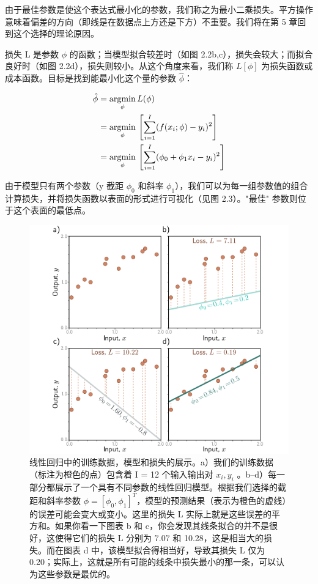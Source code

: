 由于最佳参数是使这个表达式最小化的参数，我们称之为最小二乘损失。平方操作意味着偏差的方向（即线是在数据点上方还是下方）不重要。我们将在第 5 章回到这个选择的理论原因。

损失 L 是参数 $\phi$ 的函数；当模型拟合较差时（如图 2.2b,c），损失会较大；而拟合良好时（如图 2.2d），损失则较小。从这个角度来看，我们称 $L[\phi]$ 为损失函数或成本函数。目标是找到能最小化这个量的参数 $\hat \phi$：


\begin{align}
	\hat{\phi} &= \underset{\phi}{\mathrm{argmin}} \, L(\phi) \notag \\ 
	&= \underset{\phi}{\mathrm{argmin}} \, \left[ \sum_{i=1}^{I} (f(x_i; \phi) - y_i)^2 \right] \notag \\ 
	&= \underset{\phi}{\mathrm{argmin}} \, \left[ \sum_{i=1}^{I} (\phi_0 + \phi_1 x_i - y_i)^2 \right]  
\end{align} 


由于模型只有两个参数（y 截距 $\phi_0$ 和斜率 $\phi_1$），我们可以为每一组参数值的组合计算损失，并将损失函数以表面的形式进行可视化（见图 2.3）。"最佳" 参数则位于这个表面的最低点。

\begin{figure}
	\centering
	\includegraphics[width=0.7\linewidth]{png/chapter2/SupervisedLinearFitError}
	\caption{线性回归中的训练数据，模型和损失的展示。a）我们的训练数据（标注为橙色的点）包含着 I = 12 个输入输出对 {$x_i , y_i$ }。b–d）每一部分都展示了一个具有不同参数的线性回归模型。根据我们选择的截距和斜率参数 $\phi = [\phi_0 , \phi_1 ]^T$，模型的预测结果（表示为橙色的虚线）的误差可能会变大或变小。这里的损失 L 实际上就是这些误差的平方和。如果你看一下图表 b 和 c，你会发现其线条拟合的并不是很好，这使得它们的损失 L 分别为 7.07 和 10.28，这是相当大的损失。而在图表 d 中，该模型拟合得相当好，导致其损失 L 仅为 0.20；实际上，这就是所有可能的线条中损失最小的那一条，可以认为这些参数是最优的。}

\end{figure}

